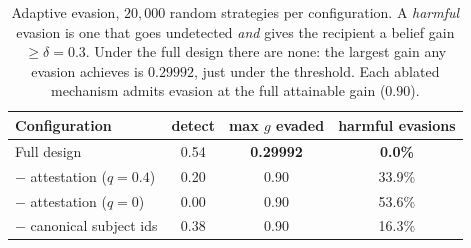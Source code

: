 \documentclass[conference,compsoc]{IEEEtran}
\begin{document}
\begin{table}[t]\centering\small
\begin{tabular}{lccc}
\toprule
Configuration & detect & max $g$ evaded & harmful evasions \\
\midrule
Full design & 0.54 & \textbf{0.29992} & \textbf{0.0\%} \\
$-$ attestation ($q{=}0.4$) & 0.20 & 0.90 & 33.9\% \\
$-$ attestation ($q{=}0$) & 0.00 & 0.90 & 53.6\% \\
$-$ canonical subject ids & 0.38 & 0.90 & 16.3\% \\
\bottomrule
\end{tabular}
\caption{Adaptive evasion, $20{,}000$ random strategies per configuration. A
\emph{harmful} evasion is one that goes undetected \emph{and} gives the recipient
a belief gain $\geq\delta{=}0.3$. Under the full design there are none: the
largest gain any evasion achieves is $0.29992$, just under the threshold. Each
ablated mechanism admits evasion at the full attainable gain ($0.90$).}
\label{tab:evasion}
\end{table}
\end{document}

